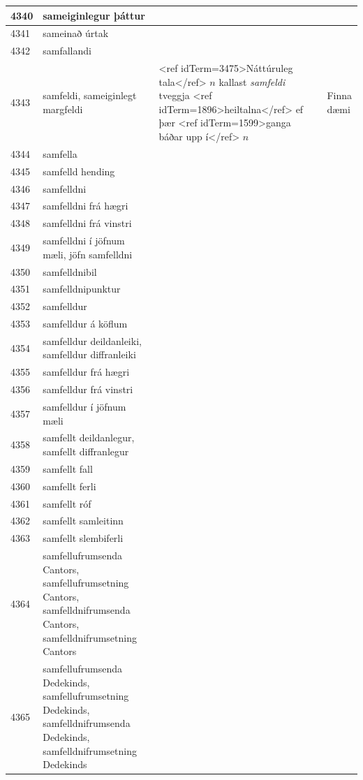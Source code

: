 \begin{longtable}{p{}|p{}|p{}|p{}|p{}}
\hline
4340 & sameiginlegur þáttur &  &  &  \\
\hline
4341 & sameinað úrtak &  &  &  \\
\hline
4342 & samfallandi &  &  &  \\
\hline
4343 & samfeldi, sameiginlegt margfeldi & <ref idTerm=3475>Náttúruleg tala</ref> $n$ kallast \textit{samfeldi} tveggja <ref idTerm=1896>heiltalna</ref> ef þær <ref idTerm=1599>ganga báðar upp í</ref> $n$ &  & Finna dæmi \\
\hline
4344 & samfella &  &  &  \\
\hline
4345 & samfelld hending &  &  &  \\
\hline
4346 & samfelldni &  &  &  \\
\hline
4347 & samfelldni frá hægri &  &  &  \\
\hline
4348 & samfelldni frá vinstri &  &  &  \\
\hline
4349 & samfelldni í jöfnum mæli, jöfn samfelldni &  &  &  \\
\hline
4350 & samfelldnibil &  &  &  \\
\hline
4351 & samfelldnipunktur &  &  &  \\
\hline
4352 & samfelldur &  &  &  \\
\hline
4353 & samfelldur á köflum &  &  &  \\
\hline
4354 & samfelldur deildanleiki, samfelldur diffranleiki &  &  &  \\
\hline
4355 & samfelldur frá hægri &  &  &  \\
\hline
4356 & samfelldur frá vinstri &  &  &  \\
\hline
4357 & samfelldur í jöfnum mæli &  &  &  \\
\hline
4358 & samfellt deildanlegur, samfellt diffranlegur &  &  &  \\
\hline
4359 & samfellt fall &  &  &  \\
\hline
4360 & samfellt ferli &  &  &  \\
\hline
4361 & samfellt róf &  &  &  \\
\hline
4362 & samfellt samleitinn &  &  &  \\
\hline
4363 & samfellt slembiferli &  &  &  \\
\hline
4364 & samfellufrumsenda Cantors, samfellufrumsetning Cantors, samfelldnifrumsenda Cantors, samfelldnifrumsetning Cantors &  &  &  \\
\hline
4365 & samfellufrumsenda Dedekinds, samfellufrumsetning Dedekinds, samfelldnifrumsenda Dedekinds, samfelldnifrumsetning Dedekinds &  &  &  \\

\end{longtable}
